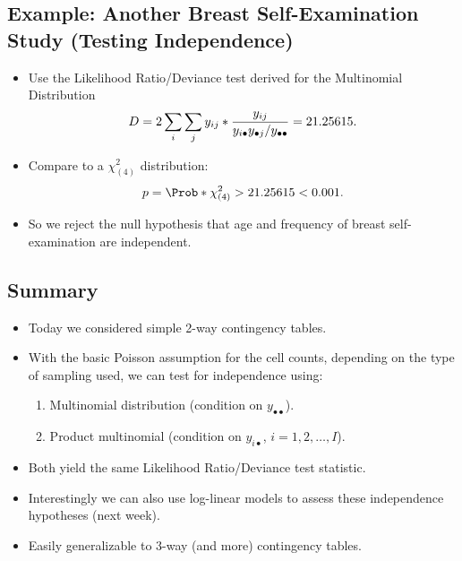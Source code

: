\documentclass{article}\usepackage[]{graphicx}\usepackage[svgnames]{xcolor}
\let\log\relax%
\begin{document}
\subsection*{Example: Another Breast Self-Examination Study (Testing Independence)}
\begin{itemize}
      \item Use the Likelihood Ratio/Deviance test derived for the Multinomial Distribution
            \[ D=2\sum_i\sum_j y_{ij}\log*{\frac{y_{ij}}{y_{i\bullet}y_{\bullet j}/y_{\bullet\bullet}}}=21.25615. \]
      \item Compare to a $ \chi^2_{(4)} $ distribution:
            \[ p=\Prob*{\chi^2_{(4)}>21.25615}<0.001. \]
      \item So we reject the null hypothesis that age and frequency of breast self-examination
            are independent.
\end{itemize}
\subsection*{Summary}
\begin{itemize}
      \item Today we considered simple 2-way contingency tables.
      \item With the basic Poisson assumption for the cell counts, depending on the type of
            sampling used, we can test for independence using:
            \begin{enumerate}[1.]
                  \item Multinomial distribution (condition on $ y_{\bullet\bullet} $).
                  \item Product multinomial (condition on $ y_{i\bullet} $, $ i=1,2,\ldots,I $).
            \end{enumerate}
      \item Both yield the same Likelihood Ratio/Deviance test statistic.
      \item Interestingly we can also use log-linear models to assess these independence
            hypotheses (next week).
      \item Easily generalizable to 3-way (and more) contingency tables.
\end{itemize}
\end{document}
